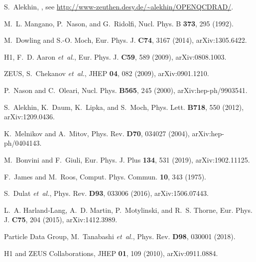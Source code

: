 \documentclass[12pt]{article}
\begin{document}
\begin{thebibliography}{99}
S.~Alekhin,
,
\newblock see \url{http://www-zeuthen.desy.de/~alekhin/OPENQCDRAD/}.

M.~L. Mangano, P.~Nason, and G.~Ridolfi,
\newblock Nucl. Phys. B {\bf 373}, 295 (1992).

M.~Dowling and S.-O. Moch,
\newblock Eur. Phys. J. {\bf C74}, 3167 (2014), arXiv:1305.6422.

H1, F.~D. Aaron {\em et~al.},
\newblock Eur. Phys. J. {\bf C59}, 589 (2009), arXiv:0808.1003.

ZEUS, S.~Chekanov {\em et~al.},
\newblock JHEP {\bf 04}, 082 (2009), arXiv:0901.1210.

P.~Nason and C.~Oleari,
\newblock Nucl. Phys. {\bf B565}, 245 (2000), arXiv:hep-ph/9903541.

S.~Alekhin, K.~Daum, K.~Lipka, and S.~Moch,
\newblock Phys. Lett. {\bf B718}, 550 (2012), arXiv:1209.0436.

K.~Melnikov and A.~Mitov,
\newblock Phys. Rev. {\bf D70}, 034027 (2004), arXiv:hep-ph/0404143.

M.~Bonvini and F.~Giuli,
\newblock Eur. Phys. J. Plus {\bf 134}, 531 (2019), arXiv:1902.11125.

F.~James and M.~Roos,
\newblock Comput. Phys. Commun. {\bf 10}, 343 (1975).

S.~Dulat {\em et~al.},
\newblock Phys. Rev. {\bf D93}, 033006 (2016), arXiv:1506.07443.

L.~A. Harland-Lang, A.~D. Martin, P.~Motylinski, and R.~S. Thorne,
\newblock Eur. Phys. J. {\bf C75}, 204 (2015), arXiv:1412.3989.

Particle Data Group, M.~Tanabashi {\em et~al.},
\newblock Phys. Rev. {\bf D98}, 030001 (2018).

{H1 and ZEUS Collaborations},
\newblock JHEP {\bf 01}, 109 (2010), arXiv:0911.0884.


\end{thebibliography}
\end{document}
